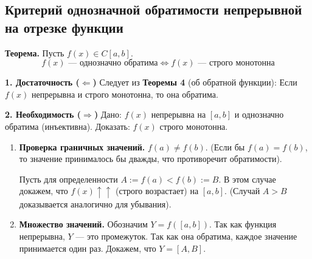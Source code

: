 \subsection{Критерий однозначной обратимости непрерывной на отрезке функции}

\textbf{Теорема.} Пусть $f(x) \in C[a, b]$.
\[ f(x) \text{ — однозначно обратима} \iff f(x) \text{ — строго монотонна} \]

\begin{tcolorbox}[title=Доказательство, breakable]
    \textbf{1. Достаточность ($\Leftarrow$)}
    Следует из \textbf{Теоремы 4} (об обратной функции):
    Если $f(x)$ непрерывна и строго монотонна, то она обратима.

    \textbf{2. Необходимость ($\Rightarrow$)}
    Дано: $f(x)$ непрерывна на $[a, b]$ и однозначно обратима (инъективна).
    Доказать: $f(x)$ строго монотонна.

    \begin{enumerate}
        \item \textbf{Проверка граничных значений.}
        $f(a) \neq f(b)$. (Если бы $f(a) = f(b)$, то значение принималось бы дважды, что противоречит обратимости).
        
        Пусть для определенности $A := f(a) < f(b) := B$.
        В этом случае докажем, что $f(x) \uparrow\uparrow$ (строго возрастает) на $[a, b]$.
        (Случай $A > B$ доказывается аналогично для убывания).

        \item \textbf{Множество значений.}
        Обозначим $Y = f([a, b])$.
        Так как функция непрерывна, $Y$ — это промежуток. Так как она обратима, каждое значение принимается один раз.
        Докажем, что $Y = [A, B]$.
        
	\begin{center}
\end{center}
\end{enumerate}
\end{tcolorbox}
